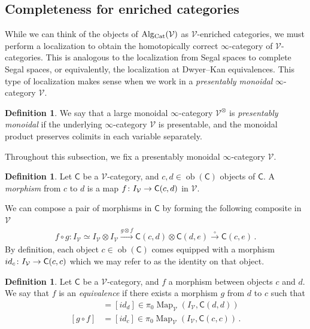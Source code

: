 \documentclass[10pt]{amsart}
\numberwithin{equation}{section}
\theoremstyle{definition}
\newtheorem{definition}[prop]{Definition}
\DeclareMathOperator{\Map}{Map}
\DeclareMathOperator{\ob}{ob}
\newcommand{\Cat}{\mathrm{Cat}\vphantom{t}}
\newcommand{\Alg}{\mathrm{Alg}\vphantom{z}}
\newcommand{\cV}{\mathcal{V}}
\newcommand{\sfC}{\mathsf{C}}
\renewcommand{\to}{\mathchoice{\longrightarrow}{\rightarrow}{}{}}
\begin{document}
	\subsection{Completeness for enriched categories}\label{subsec:enriched_categories}
	While we can think of the objects of $\Alg_{\Cat}(\cV)$ as $\cV$-enriched categories, we must perform a localization to obtain the homotopically correct $\infty$-category of $\cV$-categories.
	This is analogous to the localization from Segal spaces to complete Segal spaces, or equivalently, the localization at Dwyer--Kan equivalences. This type of localization makes sense when we work in a \emph{presentably monoidal} $\infty$-category $\cV$.
	\begin{definition}\label{def:presentably_monoidal}
		We say that a large monoidal $\infty$-category $\cV^{\otimes}$ is \emph{presentably monoidal} if the underlying $\infty$-category $\cV$ is presentable, and the monoidal product preserves colimits in each variable separately.
	\end{definition}
	Throughout this subsection, we fix a presentably monoidal $\infty$-category $\cV$.
	\begin{definition}\label{def:morphism_in_enriched_cat}
		Let $\sfC$ be a $\cV$-category, and $c,d\in \ob(\sfC)$ objects of $\sfC$. A \emph{morphism} from $c$ to $d$ is a map $f\colon I_{\cV} \to \sfC(c,d)$ in $\cV$.
	\end{definition}
	We can compose a pair of morphisms in $\sfC$ by forming the following composite in $\cV$
	\begin{align*}
		f\circ g \colon I_{\cV} \simeq I_{\cV} \otimes I_{\cV} \xrightarrow{g\otimes f} \sfC(c,d) \otimes \sfC(d,e) \xrightarrow{\circ} \sfC(c,e) \,.
	\end{align*}
	By definition, each object $c\in \ob(\sfC)$ comes equipped with a morphism $id_{c} \colon I_{\cV} \to \sfC(c,c)$ which we may refer to as the identity on that object.

	\begin{definition}\label{def:equivalence_in_enriched_cat}
		Let $\sfC$ be a $\cV$-category, and $f$ a morphism between objects $c$ and $d$.
		We say that $f$ is an \emph{equivalence} if there exists a morphism $g$ from $d$ to $c$ such that
		\begin{align*}
			[f\circ g] &= [id_{d}] \in \pi_0\Map_{\cV}(I_{\cV}, \sfC(d,d)) \\
			[g\circ f] &= [id_{c}] \in \pi_{0}\Map_{\cV}(I_{\cV}, \sfC(c,c)) \,.
		\end{align*}
	\end{definition}
\end{document}
